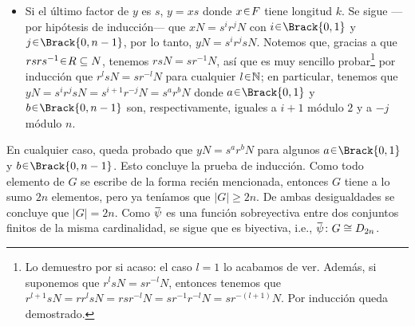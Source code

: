 \begin{sol}[Demostración]
\begin{itemize}
    \item Si el último factor de $y$ es $s$, $y = xs$ donde $x \en F$ tiene longitud $k$. Se sigue ---por hipótesis de inducción--- que $xN = s^ir^jN$ con $i \en \Brack{0,1}$ y $j \en \Brack{0,n-1}$, por lo tanto, $yN = s^ir^jsN$. Notemos que, gracias a que $rsrs^{-1} \en R \subseteq N$, tenemos $rsN = sr^{-1}N$, así que es muy sencillo probar\footnote{Lo demuestro por si acaso: el caso $l=1$ lo acabamos de ver. Además, si suponemos que $r^lsN = sr^{-l}N$, entonces tenemos que $r^{l+1}sN = rr^lsN=rsr^{-l}N=sr^{-1}r^{-l}N=sr^{-(l+1)}N$. Por inducción queda demostrado.} por inducción que $r^lsN = sr^{-l}N$ para cualquier $l \en \mathbb{N}$; en particular, tenemos que $yN = s^ir^jsN = s^{i+1}r^{-j}N = s^{a}r^{b}N$ donde $a \en \Brack{0,1}$ y $b \en\Brack{0,n-1}$ son, respectivamente, iguales a $i+1$ módulo $2$ y a $-j$ módulo $n$.
\end{itemize}
En cualquier caso, queda probado que $yN = s^ar^bN$ para algunos $a \en \Brack{0,1}$ y $b \en\Brack{0,n-1}$. Esto concluye la prueba de inducción. Como todo elemento de $G$ se escribe de la forma recién mencionada, entonces $G$ tiene a lo sumo $2n$ elementos, pero ya teníamos que $|G| \geq 2n$. De ambas desigualdades se concluye que $|G| = 2n$. Como $\ubar{\psi}$ es una función sobreyectiva entre dos conjuntos finitos de la misma cardinalidad, se sigue que es biyectiva, i.e., $\ubar{\psi} \colon G \cong D_{2n}$.
\end{sol}\clearpage

